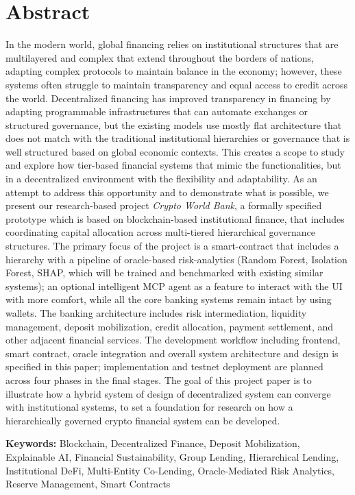 \documentclass[12pt, a4paper]{report}
\begin{document}
\chapter*{Abstract}
{}

In the modern world, global financing relies on institutional structures that are multilayered and complex that extend throughout the borders of nations, adapting complex protocols to maintain balance in the economy; however, these systems often struggle to maintain transparency and equal access to credit across the world. Decentralized financing has improved transparency in financing by adapting programmable infrastructures that can automate exchanges or structured governance, but the existing models use mostly flat architecture that does not match with the traditional institutional hierarchies or governance that is well structured based on global economic contexts. This creates a scope to study and explore how tier-based financial systems that mimic the functionalities, but in a decentralized environment with the flexibility and adaptability. As an attempt to address this opportunity and to demonstrate what is possible, we present our research-based project \textit{Crypto World Bank}, a formally specified prototype which is based on blockchain-based institutional finance, that includes coordinating capital allocation across multi-tiered hierarchical governance structures. The primary focus of the project is a smart-contract that includes a hierarchy with a pipeline of oracle-based risk-analytics (Random Forest, Isolation Forest, SHAP, which will be trained and benchmarked with existing similar systems); an optional intelligent MCP agent as a feature to interact with the UI with more comfort, while all the core banking systems remain intact by using wallets. The banking architecture includes risk intermediation, liquidity management, deposit mobilization, credit allocation, payment settlement, and other adjacent financial services. The development workflow including frontend, smart contract, oracle integration and overall system architecture and design is specified in this paper; implementation and testnet deployment are planned across four phases in the final stages. The goal of this project paper is to illustrate how a hybrid system of design of decentralized system can converge with institutional systems, to set a foundation for research on how a hierarchically governed crypto financial system can be developed.

\vspace{0.5em}
\noindent\textbf{Keywords:} Blockchain, Decentralized Finance, Deposit Mobilization, Explainable AI, Financial Sustainability, Group Lending, Hierarchical Lending, Institutional DeFi, Multi-Entity Co-Lending, Oracle-Mediated Risk Analytics, Reserve Management, Smart Contracts
\end{document}
